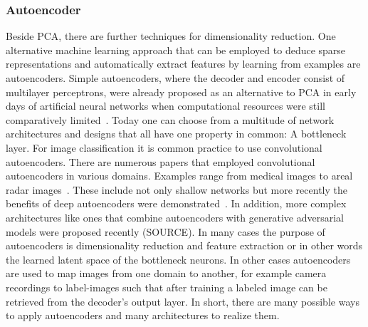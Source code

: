 \subsubsection{Autoencoder}

Beside PCA, there are further techniques for dimensionality reduction. One alternative machine learning approach that can be employed to deduce sparse representations and automatically extract features by learning from examples are autoencoders. Simple autoencoders, where the decoder and encoder consist of multilayer perceptrons, were already proposed as an alternative to PCA in early days of artificial neural networks when computational resources were still comparatively limited~\citep{kramer1991nonlinear}.  Today one can choose from a multitude of network architectures and designs that all have one property in common: A bottleneck layer. For image classification it is common practice to use convolutional autoencoders. There are numerous papers that employed convolutional autoencoders in various domains. Examples range from medical images to areal radar images~\citep{chen2017deep}. These include not only shallow networks but more recently the benefits of deep autoencoders were demonstrated~\citep{geng2015high}. In addition, more complex architectures like ones that combine autoencoders with generative adversarial models were proposed recently (SOURCE). In many cases the purpose of autoencoders is dimensionality reduction and feature extraction or in other words the learned latent space of the bottleneck neurons. In other cases autoencoders are used to map images from one domain to another, for example camera recordings to label-images such that after training a labeled image can be retrieved from the decoder’s output layer. In short, there are many possible ways to apply autoencoders and many architectures to realize them. \\
\\
